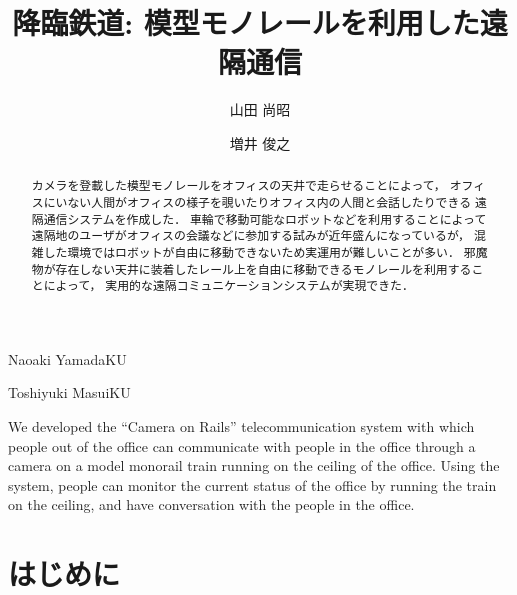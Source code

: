 \documentclass[submit,techreq]{ipsj}
\begin{document}
\title{降臨鉄道: 模型モノレールを利用した遠隔通信}


\author{山田 尚昭}{Naoaki Yamada}{KU}
\author{増井 俊之}{Toshiyuki Masui}{KU}

\begin{abstract}

カメラを登載した模型モノレールをオフィスの天井で走らせることによって，
オフィスにいない人間がオフィスの様子を覗いたりオフィス内の人間と会話したりできる
遠隔通信システムを作成した．
車輪で移動可能なロボットなどを利用することによって
遠隔地のユーザがオフィスの会議などに参加する試みが近年盛んになっているが，
混雑した環境ではロボットが自由に移動できないため実運用が難しいことが多い．
邪魔物が存在しない天井に装着したレール上を自由に移動できるモノレールを利用することによって，
実用的な遠隔コミュニケーションシステムが実現できた．
\end{abstract}

\begin{eabstract}
We developed the ``Camera on Rails'' telecommunication system with
which people out of the office can communicate with people in the
office through a camera on a model monorail train running on the ceiling
of the office. Using the system, people can monitor the current status
of the office by running the train on the ceiling, and have
conversation with the people in the office.
\end{eabstract}

\maketitle

\section{はじめに}
\end{document}
